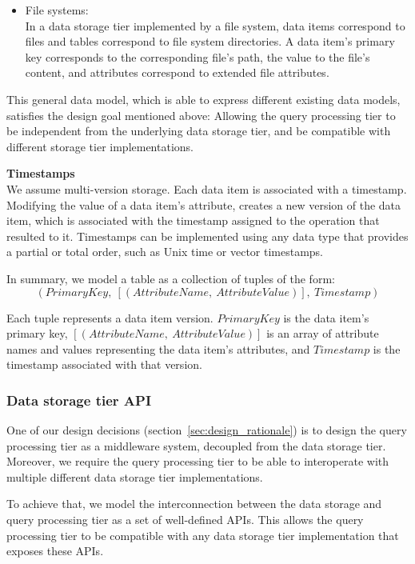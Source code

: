 \begin{itemize}
  \item File systems: \\
  In a data storage tier implemented by a file system, data items correspond to files and tables correspond to file
  system directories.
  A data item's primary key corresponds to the corresponding file's path, the value to the file's content,
  and attributes correspond to extended file attributes.
\end{itemize}

This general data model, which is able to express different existing data models, satisfies the design goal mentioned
above:
Allowing the query processing tier to be independent from the underlying data storage tier, and be compatible with
different storage tier implementations.

\medskip
\noindent
\textbf{Timestamps} \\
We assume multi-version storage.
Each data item is associated with a timestamp.
Modifying the value of a data item's attribute, creates a new version of the data item,
which is associated with the timestamp assigned to the operation that resulted to it.
Timestamps can be implemented using any data type that provides a partial or total order, such as Unix time or vector timestamps.

\medskip
\noindent
In summary, we model a table as a collection of tuples of the form:
\[
  (PrimaryKey,~[(AttributeName,~AttributeValue)],~Timestamp)
\]
\begin{sloppypar}
Each tuple represents a data item version.
$PrimaryKey$ is the data item's primary key, $[(AttributeName,~AttributeValue)]$ is an array of attribute names and values
representing the data item's attributes, and $Timestamp$ is the timestamp associated with that version.
\end{sloppypar}

\subsubsection{Data storage tier API}
One of our design decisions (section~\ref{sec:design_rationale}) is to design the query processing tier as a middleware
system, decoupled from the data storage tier.
Moreover, we require the query processing tier to be able to interoperate with multiple different data storage tier implementations.

To achieve that, we model the interconnection between the data storage and query processing tier as a set of well-defined APIs.
This allows the query processing tier to be compatible with any data storage tier implementation that exposes these APIs.

